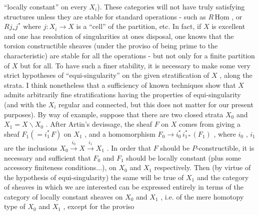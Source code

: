 
``locally constant'' on every $X_i$). These categories will not have
truly satisfying structures unless they are stable for standard
operations - such as $R\,\underline{\mathrm{Hom}}$ , or $Rj_*j^*$ where $j : X_i \to X$ is
a ``cell'' of the partition, etc. In fact, if $X$ is excellent and
one has resolution of singularities at ones disposal, one
knows that the torsion constructible sheaves (under the proviso
of being prime to the characteristic) are stable for all the
operations - but not only for a finite partition of $X$ but for
all. To have such a finer stability, it is necessary to make
some very strict hypotheses of ``equi-singularity'' on the given
stratification of $X$ , along the strata. I think nonetheless that
a sufficiency of known techniques show that $X$ admits arbitrarily
fine stratifications having the properties of equi-singularity
(and with the $X_i$ regular and connected, but this does not matter
for our present purposes). By way of example, suppose that there
are two closed strata $X_0$ and $X_1 = X\backslash X_0$ . After Artin's
devissage, the sheaf $F$ on $X$ comes from giving a sheaf
$F_1(= i_1^*\,F)$ on $X_1$ , and a homomorphism $F_0 \to i_0^*\,i_{1*}^*(F_1)$ , where
$i_0$ , $i_1$ are the inclusions $X_0 \xrightarrow{i_0} X \xrightarrow{i_1} X_1$ .
In order that $F$ should be $P$-constructible, it is necessary and
sufficient that $F_0$ and $F_1$ should be locally constant (plus
some accessory finiteness conditions...), on $X_0$ and $X_1$
respectively. Then (by virtue of the hypothesis of equi-singularity)
the same will be true of $X_1$ and the category of sheaves in which
we are interested can be expressed entirely in terms of the
category of locally constant sheaves on $X_0$ and $X_1$ , i.e. of
the mere homotopy type of $X_0$ and $X_1$ , except for the proviso


